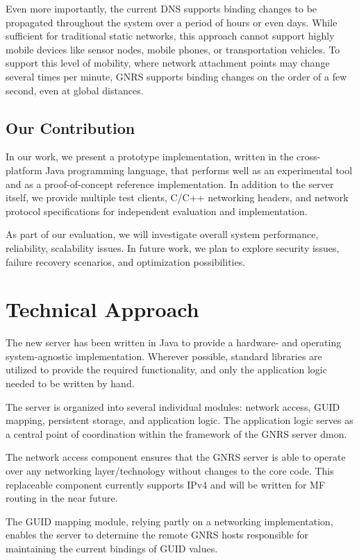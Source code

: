 \documentclass[conference, 11pt]{IEEEtran}
\begin{document}
Even more importantly, the current DNS supports binding changes to be
propagated throughout the system over a period of hours or even days.  While
sufficient for traditional static networks, this approach cannot support
highly mobile devices like sensor nodes, mobile phones, or transportation
vehicles.  To support this level of mobility, where network attachment points
may change several times per minute, GNRS supports binding changes on the
order of a few second, even at global distances.

\subsection{Our Contribution}
In our work, we present a prototype implementation, written in the
cross-platform Java programming language, that performs well as an
experimental tool and as a proof-of-concept reference implementation.  In
addition to the server itself, we provide multiple test clients, C/C++
networking headers, and network protocol specifications for independent
evaluation and implementation.

As part of our evaluation, we will investigate overall system performance,
reliability, scalability issues.  In future work, we plan to explore security
issues, failure recovery scenarios, and optimization possibilities.

\section{Technical Approach}
The new server has been written in Java to provide a hardware- and operating
system-agnostic implementation.  Wherever possible, standard libraries are
utilized to provide the required functionality, and only the application logic
needed to be written by hand.

The server is organized into several individual modules: network access, GUID
mapping, persistent storage, and application logic.  The application logic
serves as a central point of coordination within the framework of the GNRS
server dmon.

The network access component ensures that the GNRS server is able to operate
over any networking layer/technology without changes to the core code.  This
replaceable component currently supports IPv4 and will be written for MF
routing in the near future.

The GUID mapping module, relying partly on a networking implementation,
enables the server to determine the remote GNRS hosts responsible for
maintaining the current bindings of GUID values.
\end{document}
